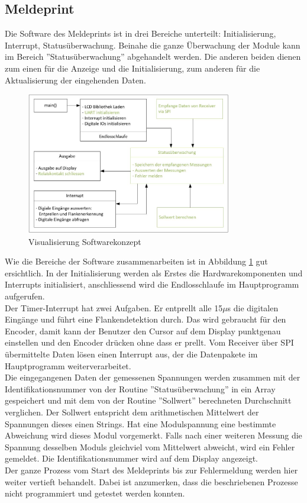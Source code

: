 \subsection{Meldeprint}
Die Software des Meldeprints ist in drei Bereiche unterteilt: Initialisierung, Interrupt, Statusüberwachung. Beinahe die ganze Überwachung der Module kann im Bereich ''Statusüberwachung'' abgehandelt werden. Die anderen beiden dienen zum einen für die Anzeige und die Initialisierung, zum anderen für die Aktualisierung der eingehenden Daten.

\begin{figure}[htbp] 
  \centering
     \includegraphics[width=0.8\textwidth]{graphics/reportboard-software-river}
  \caption{Visualisierung Softwarekonzept}
  \label{fig:reportboard-software-river}
\end{figure}

Wie die Bereiche der Software zusammenarbeiten ist in Abbildung \ref{fig:reportboard-software-river} gut ersichtlich. In der Initialisierung werden als Erstes die Hardwarekomponenten  und Interrupts initialisiert, anschliessend wird die Endlosschlaufe im Hauptprogramm aufgerufen.\\
Der Timer-Interrupt hat zwei Aufgaben. Er entprellt alle 15$\mu$s die digitalen Eingänge und führt eine Flankendetektion durch. Das wird gebraucht für den Encoder, damit kann der Benutzer den Cursor auf dem Display punktgenau einstellen und den Encoder drücken ohne dass er prellt. Vom Receiver über SPI übermittelte Daten lösen einen Interrupt aus, der die Datenpakete im Hauptprogramm weiterverarbeitet.\\
Die eingegangenen Daten der gemessenen Spannungen werden zusammen mit der Identifikationsnummer von der Routine ''Statusüberwachung'' in ein Array gespeichert und mit dem von der Routine ''Sollwert'' berechneten Durchschnitt verglichen. Der Sollwert entspricht dem arithmetischen Mittelwert der Spannungen dieses einen Strings. Hat eine Modulspannung eine bestimmte Abweichung wird dieses Modul vorgemerkt. Falls nach einer weiteren Messung die Spannung desselben Moduls gleichviel vom Mittelwert abweicht, wird ein Fehler gemeldet. Die Identifikationsnummer wird auf dem Display angezeigt.\\
Der ganze Prozess vom Start des Meldeprints bis zur Fehlermeldung werden hier weiter vertieft behandelt. Dabei ist anzumerken, dass die beschriebenen Prozesse nicht programmiert und getestet werden konnten.

